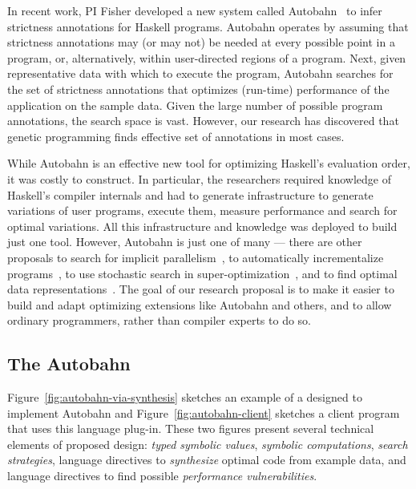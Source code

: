 In recent work, PI Fisher developed a new system called Autobahn~\cite{autobahn}
to infer strictness annotations for Haskell programs.  Autobahn
operates by assuming that strictness annotations may (or may not) be
needed at every possible point in a program, or, alternatively, within
user-directed regions of a program.  Next, given representative data with which to
execute the program, Autobahn searches for the set of strictness annotations
that optimizes (run-time) performance of the application on the sample data.
Given the large number of possible program annotations, the search space is
vast.  However, our research has discovered that genetic programming finds
effective set of annotations in most cases.

While Autobahn is an effective new tool for optimizing Haskell's evaluation
order, it was costly to construct.  In particular, the researchers
required knowledge of Haskell's compiler internals and had to generate
infrastructure to generate variations of user programs, execute them,
measure performance and search for optimal variations.  All this
infrastructure and knowledge was deployed to build just one tool.
However, Autobahn is just one of many --- there are other proposals to
search for implicit parallelism~\cite{implicit-parallel}, to
automatically incrementalize
programs~\cite{type-directed-incrementalization}, to use stochastic search
in super-optimization~\cite{stochastic-superopt}, and to find optimal data
representations~\cite{data-rep-synth,conc-data-rep-synth}.  The goal of our research proposal
is to make it easier to build and adapt optimizing extensions like
Autobahn and others, and to allow ordinary programmers, rather than
compiler experts to do so.

\subsection{The Autobahn \rasp}
\label{sec:autobahn}

Figure~\ref{fig:autobahn-via-synthesis} sketches an example of a
\rasp{} designed to implement Autobahn and Figure~\ref{fig:autobahn-client} sketches a client program that uses this language plug-in.  These two
figures present
several technical elements of proposed design:  \emph{typed symbolic values},
\emph{symbolic computations}, \emph{search strategies}, language directives to
\emph{synthesize} optimal code from example data, and language directives to
find possible \emph{performance vulnerabilities}.

